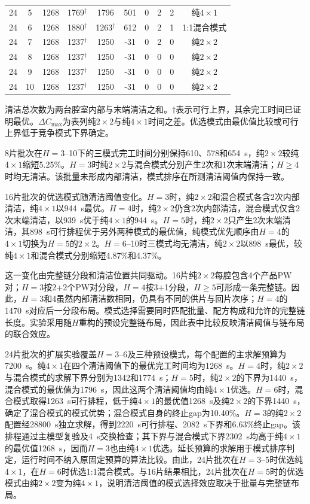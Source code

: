 \documentclass[final,5p,times,twocolumn]{elsarticle}
\begin{document}
\begin{table}[tp]
\begin{tabular}{cccccccccc}
24 & 5 & 1268 & 1769$^{\dagger}$ & 1796 & 501 & 0 & 2 & 2 & 纯$4\times1$\\
24 & 6 & 1268 & 1880$^{\dagger}$ & 1263$^{\dagger}$ & 612 & 0 & 2 & 1 & 1:1混合模式\\
24 & 7 & 1268 & 1237$^{\dagger}$ & 1250 & -31 & 0 & 2 & 0 & 纯$2\times2$\\
24 & 8 & 1268 & 1237$^{\dagger}$ & 1250 & -31 & 0 & 0 & 0 & 纯$2\times2$\\
24 & 9 & 1268 & 1237$^{\dagger}$ & 1250 & -31 & 0 & 0 & 0 & 纯$2\times2$\\
24 & 10 & 1268 & 1237$^{\dagger}$ & 1250 & -31 & 0 & 0 & 0 & 纯$2\times2$\\
\bottomrule
\end{tabular}
\par\smallskip
\parbox{0.95\textwidth}{\footnotesize 清洁总次数为两台腔室内部与末端清洁之和。$\dagger$表示可行上界，其余完工时间已证明最优。$\Delta C_{\max}$为表列纯$2\times2$与纯$4\times1$时间之差。优选模式由最优值比较或可行上界低于竞争模式下界确定。}
\end{table}

8片批次在$H=3$--10下的三模式完工时间分别保持610、578和654~s，纯$2\times2$较纯$4\times1$缩短5.25\%。$H=3$时纯$2\times2$与混合模式分别产生2次和1次末端清洁；$H\ge4$时均无清洁。该批量未形成内部清洁，模式排序在所测清洁阈值内保持一致。

16片批次的优选模式随清洁阈值变化。$H=3$时，纯$2\times2$和混合模式各含2次内部清洁，纯$4\times1$以944~s最优。$H=4$时，纯$2\times2$仍含2次内部清洁，混合模式仅含2次末端清洁，以939~s优于纯$4\times1$的944~s。$H=5$时，纯$2\times2$只产生2次末端清洁，其898~s可行排程优于另外两种模式的最优值，纯模式优先顺序由$H=4$的$4\times1$切换为$H=5$的$2\times2$。$H=6$--10时三模式均无清洁，纯$2\times2$以898~s最优，较纯$4\times1$和混合模式分别缩短4.87\%和4.37\%。

这一变化由完整链分段和清洁位置共同驱动。16片纯$2\times2$每腔包含4个产品PW对；$H=3$按2+2个PW对分段，$H=4$按3+1分段，$H\ge5$可形成一条完整链。因此，$H=3$和4虽然内部清洁数相同，仍具有不同的供片与回片次序；$H=4$的1470~s对应后一分段布局。模式选择需要同时匹配批量、配方构成和允许的完整链长度。实验采用随$H$重构的预设完整链布局，因此表中比较反映清洁阈值与链布局的联合效应。

24片批次的扩展实验覆盖$H=3$--6及三种预设模式，每个配置的主求解预算为7200~s。纯$4\times1$在四个清洁阈值下的最优完工时间均为1268~s。$H=4$时，纯$2\times2$与混合模式的求解下界分别为1342和1774~s；$H=5$时，纯$2\times2$的下界为1440~s，混合模式的最优值为1796~s，因此这两个清洁阈值均由纯$4\times1$优选。$H=6$时，混合模式取得1263~s可行排程，低于纯$4\times1$的最优值1268~s及纯$2\times2$的下界1440~s，确定了混合模式的模式优势；混合模式自身的终止gap为10.40\%。$H=3$的纯$2\times2$配置经28800~s独立求解，得到2220~s可行排程、2082~s下界和6.63\%终止gap。该排程通过主模型复验及4~s交换检查；其下界与混合模式下界2302~s均高于纯$4\times1$的最优值1268~s，因而$H=3$也由纯$4\times1$优选。延长预算的求解用于模式排序判定，运行时间不纳入原固定预算的算法比较。由此，24片批次在$H=3$--5时优选纯$4\times1$，在$H=6$时优选1:1混合模式。与16片结果相比，24片批次在$H=5$时的优选模式由纯$2\times2$变为纯$4\times1$，说明清洁阈值的模式选择效应取决于批量与完整链布局。
\end{document}
